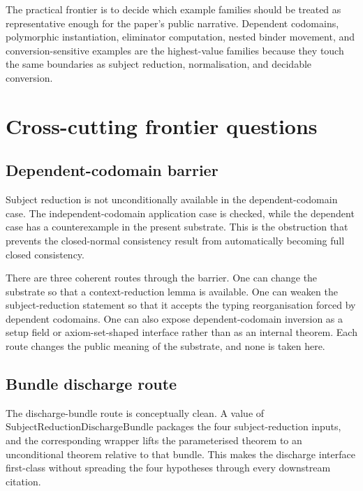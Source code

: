 The practical frontier is to decide which example families should be treated
as representative enough for the paper's public narrative. Dependent
codomains, polymorphic instantiation, eliminator computation, nested binder
movement, and conversion-sensitive examples are the highest-value families
because they touch the same boundaries as subject reduction, normalisation, and
decidable conversion.

\section{Cross-cutting frontier questions}
\label{sec:metacic-open-problems-cross-cutting}

\subsection{Dependent-codomain barrier}
\label{subsec:metacic-open-problems-dependent-codomain}

Subject reduction is not unconditionally available in the dependent-codomain
case. The independent-codomain application case is checked, while the dependent
case has a counterexample in the present substrate. This is the obstruction
that prevents the closed-normal consistency result from automatically becoming
full closed consistency.

There are three coherent routes through the barrier. One can change the
substrate so that a context-reduction lemma is available. One can weaken the
subject-reduction statement so that it accepts the typing reorganisation
forced by dependent codomains. One can also expose dependent-codomain inversion
as a setup field or axiom-set-shaped interface rather than as an internal
theorem. Each route changes the public meaning of the substrate, and none is
taken here.

\subsection{Bundle discharge route}
\label{subsec:metacic-open-problems-bundle}

The discharge-bundle route is conceptually clean. A value of
$\mathrm{SubjectReductionDischargeBundle}$ packages the four subject-reduction
inputs, and the corresponding wrapper lifts the parameterised theorem to an
unconditional theorem relative to that bundle. This makes the discharge
interface first-class without spreading the four hypotheses through every
downstream citation.

